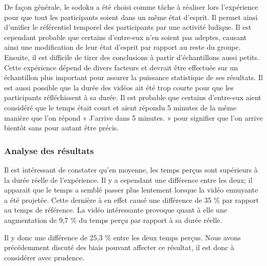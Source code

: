 \documentclass[12pt,fleqn,oneside,openany]{book} %
\begin{document}
De façon générale, le sodoku a été choisi comme tâche à réaliser lors l'expérience pour que tout les participants soient dans un même état d'esprit. Il permet ainsi d'unifier le référentiel temporel des participants par une activité ludique. Il est cependant probable que certains d'entre-eux n'en soient pas adeptes, causant ainsi une modification de leur état d'esprit par rapport au reste du groupe.
Ensuite, il est difficile de tirer des conclusions à partir d'échantillons aussi petits. Cette expérience dépend de divers facteurs et devrait être effectuée sur un échantillon plus important pour assurer la puissance statistique de ses résultats.
Il est aussi possible que la durée des vidéos ait été trop courte pour que les participants réfléchissent à sa durée. Il est probable que certains d'entre-eux aient considéré que le temps était court et aient répondu 5 minutes de la même manière que l'on répond « J'arrive dans 5 minutes. » pour signifier que l'on arrive bientôt sans pour autant être précis. 




\subsubsection{Analyse des résultats} \label{sssec:analyseResult1.1}
Il est intéressant de constater qu'en moyenne, les temps perçus sont supérieurs à la durée réelle de l'expérience. Il y a cependant une différence entre les deux; il apparait que le temps a semblé passer plus lentement lorsque la vidéo ennuyante a été projetée. Cette dernière à en effet causé une différence de 35 \% par rapport au temps de référence. La vidéo intéressante provoque quant à elle une augmentation de 9,7 \% du temps perçu par rapport à sa durée réelle.

Il y donc une différence de 25,3 \% entre les deux temps perçus. Nous avons précédemment discuté des biais pouvant affecter ce résultat, il est donc à considérer avec prudence. 
\end{document}
